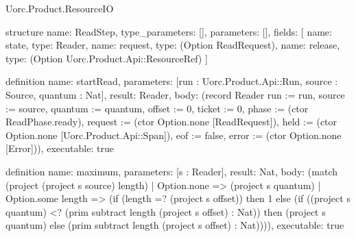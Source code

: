 \begin{lexlean}{Uorc.Product.ResourceIO}
\begin{semanticmodule}
structure{
  name: ReadStep,
  type_parameters: [],
  parameters: [],
  fields: [
    {name: state, type: Reader},
    {name: request, type: (Option ReadRequest)},
    {name: release, type: (Option Uorc.Product.Api::ResourceRef)}
  ]
}

definition{
  name: startRead,
  parameters: [run : Uorc.Product.Api::Run, source : Source, quantum : Nat],
  result: Reader,
  body: (record Reader {run := run, source := source, quantum := quantum, offset := 0, ticket := 0, phase := (ctor ReadPhase.ready), request := (ctor Option.none [ReadRequest]), held := (ctor Option.none [Uorc.Product.Api::Span]), eof := false, error := (ctor Option.none [Error])}),
  executable: true
}

definition{
  name: maximum,
  parameters: [s : Reader],
  result: Nat,
  body: (match (project (project s source) length)
    | Option.none => (project s quantum)
    | Option.some length => (if (length =? (project s offset)) then 1 else (if ((project s quantum) <? (prim subtract length (project s offset) : Nat)) then (project s quantum) else (prim subtract length (project s offset) : Nat)))),
  executable: true
}


\end{semanticmodule}
\end{lexlean}
